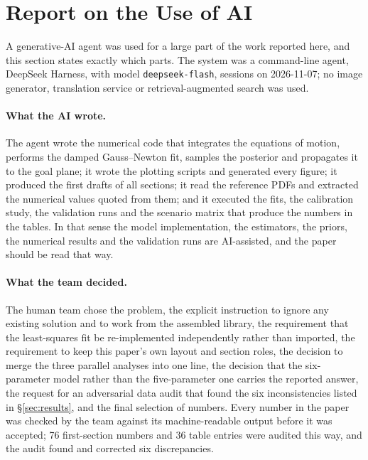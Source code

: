 \section{Report on the Use of AI}
\label{sec:ai}

A generative-AI agent was used for a large part of the work reported here, and
this section states exactly which parts. The system was a command-line agent,
DeepSeek Harness, with model \texttt{deepseek-flash}, sessions on 2026-11-07; no
image generator, translation service or retrieval-augmented search was used.

\paragraph{What the AI wrote.} The agent wrote the numerical code that integrates
the equations of motion, performs the damped Gauss--Newton fit, samples the
posterior and propagates it to the goal plane; it wrote the plotting scripts and
generated every figure; it produced the first drafts of all sections; it read the
reference PDFs and extracted the numerical values quoted from them; and it
executed the fits, the calibration study, the validation runs and the scenario
matrix that produce the numbers in the tables. In that sense the model
implementation, the estimators, the priors, the numerical results and the
validation runs are AI-assisted, and the paper should be read that way.

\paragraph{What the team decided.} The human team chose the problem, the
explicit instruction to ignore any existing solution and to work from the
assembled library, the requirement that the least-squares fit be re-implemented
independently rather than imported, the requirement to keep this paper's own
layout and section roles, the decision to merge the three parallel analyses into
one line, the decision that the six-parameter model rather than the five-parameter
one carries the reported answer, the request for an adversarial data audit that
found the six inconsistencies listed in \S\ref{sec:results}, and the final
selection of numbers. Every number in the paper was checked by the team against
its machine-readable output before it was accepted; 76 first-section numbers and
36 table entries were audited this way, and the audit found and corrected six
discrepancies.

